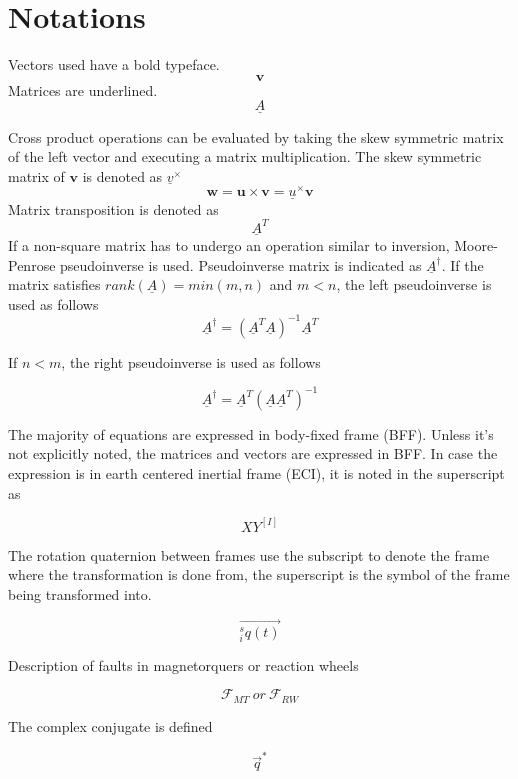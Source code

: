\section*{Notations}

Vectors used have a bold typeface.  
\begin{equation*}
\textbf{v}
\end{equation*}
Matrices are underlined.
\begin{equation*}
\underline{A}
\end{equation*}

Cross product operations can be evaluated by taking the skew symmetric matrix of the left vector and executing a matrix multiplication. The skew symmetric matrix of $\textbf{v}$ is denoted as $\underline{v}^\times$
\begin{equation*}
	\textbf{w} = \textbf{u} \times \textbf{v} = \underline{u}^\times \textbf{v}
\end{equation*}
Matrix transposition is denoted as
\begin{equation*}
\underline{A}^T
\end{equation*}
If a non-square matrix has to undergo an operation similar to inversion, Moore-Penrose pseudoinverse is used. Pseudoinverse matrix is indicated as $\underline{A}^\dagger$. If the matrix satisfies $rank(\underline{A}) = min(m,n)$ and $m < n$, the left pseudoinverse is used as follows
\begin{equation*}
\underline{A}^\dagger    =   (\underline{A}^T \underline{A} )^{-1} \underline{A}^T 
\end{equation*}

If $n < m$, the right pseudoinverse is used as follows

\begin{equation*}
 \underline{A}^\dagger    =  \underline{A}^T  (\underline{A} \underline{A}^T)^{-1}
\end{equation*}


The majority of equations are expressed in body-fixed frame (BFF). Unless it's not explicitly noted, the matrices and vectors are expressed in BFF. In case the expression is in earth centered inertial frame (ECI), it is noted in the superscript as 

\begin{equation*}
XY^{[I]}
\end{equation*}

The rotation quaternion between frames use the subscript to denote the frame where the transformation is done from, the superscript is the symbol of the frame being transformed into.

\begin{equation*}
\vec{^s_i q(t)}
\end{equation*}

Description of faults in magnetorquers or reaction wheels

\begin{equation*}
\mathcal{F}_{MT} \ or  \  \mathcal{F}_{RW}
\end{equation*}

The complex conjugate is defined

\begin{equation*}
 \vec q^\ast
\end{equation*}



